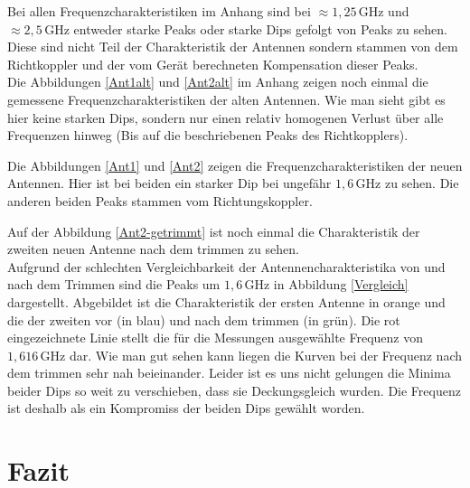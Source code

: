 \documentclass[titlepage,11pt,a4paper,ngerman]{article}
\newcommand{\tx}[1]{\textrm{#1}}
\begin{document}
Bei allen Frequenzcharakteristiken im Anhang sind bei $ \approx 1{,}25 \, \tx{GHz} $ und $ \approx 2{,}5 \, \tx{GHz} $ entweder starke Peaks oder starke Dips gefolgt von Peaks zu sehen. Diese sind nicht Teil der Charakteristik der Antennen sondern stammen von dem Richtkoppler und der vom Gerät berechneten Kompensation dieser Peaks.\\[10pt]
\noindent
Die Abbildungen \ref{Ant1alt} und \ref{Ant2alt} im Anhang zeigen noch einmal die gemessene Frequenzcharakteristiken der alten Antennen. Wie man sieht gibt es hier keine starken Dips, sondern nur einen relativ homogenen Verlust über alle Frequenzen hinweg (Bis auf die beschriebenen Peaks des Richtkopplers).\par
Die Abbildungen \ref{Ant1} und \ref{Ant2} zeigen die Frequenzcharakteristiken der neuen Antennen. Hier ist bei beiden ein starker Dip bei ungefähr $ 1{,}6 \, \tx{GHz} $ zu sehen. Die anderen beiden Peaks stammen vom Richtungskoppler.\par
Auf der Abbildung \ref{Ant2-getrimmt} ist noch einmal die Charakteristik der zweiten neuen Antenne nach dem trimmen zu sehen.\\[10pt]
\noindent
Aufgrund der schlechten Vergleichbarkeit der Antennencharakteristika von und nach dem Trimmen sind die Peaks um $ 1{,}6 \, \tx{GHz} $ in Abbildung \ref{Vergleich} dargestellt. Abgebildet ist die Charakteristik der ersten Antenne in orange und die der zweiten vor (in blau) und nach dem trimmen (in grün). Die rot eingezeichnete Linie stellt die für die Messungen ausgewählte Frequenz von $ 1{,}616 \, \tx{GHz} $ dar. Wie man gut sehen kann liegen die Kurven bei der Frequenz nach dem trimmen sehr nah beieinander. Leider ist es uns nicht gelungen die Minima beider Dips so weit zu verschieben, dass sie Deckungsgleich wurden. Die Frequenz ist deshalb als ein Kompromiss der beiden Dips gewählt worden.

\section{Fazit}
\end{document}
